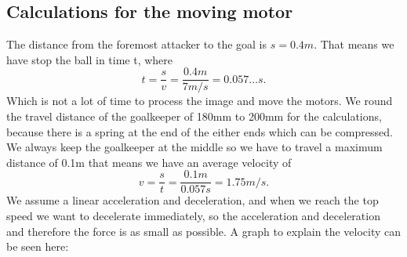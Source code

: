 \subsection{Calculations for the moving motor}\label{subsec:moving_motor}
The distance from the foremost attacker to the goal is $s=0.4m$.
That means we have stop the ball in time t, where
\begin{equation}
    \label{eq:stopping_time}
    t = \frac{s}{v} = \frac{0.4m}{7m/s} = 0.057\dots s.
\end{equation}
Which is not a lot of time to process the image and move the motors.
We round the travel distance of the goalkeeper of 180mm to 200mm for the calculations, because there is a spring at the end of the either ends which can be compressed.
We always keep the goalkeeper at the middle so we have to travel a maximum distance of 0.1m that means we have an average velocity of
\begin{equation}
    \label{eq:average_velocity}
    v = \frac{s}{t} = \frac{0.1m}{0.057s} = 1.75m/s.
\end{equation}
We assume a linear acceleration and deceleration, and when we reach the top speed we want to decelerate immediately, so the acceleration and deceleration and therefore the force is as small as possible.
A graph to explain the velocity can be seen here:

\begin{center}

\end{center}

